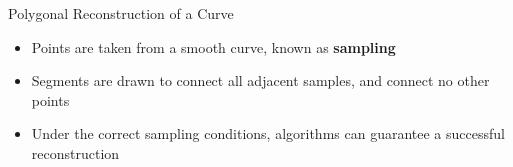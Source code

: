 \begin{frame}{Polygonal Reconstruction of a Curve}
	\begin{itemize}
		\item Points are taken from a smooth curve, known as \textbf{sampling}
		\item Segments are drawn to connect all adjacent samples, and connect no other points
		\item Under the correct sampling conditions, algorithms can guarantee a successful reconstruction
	\end{itemize}
	
\end{frame}
